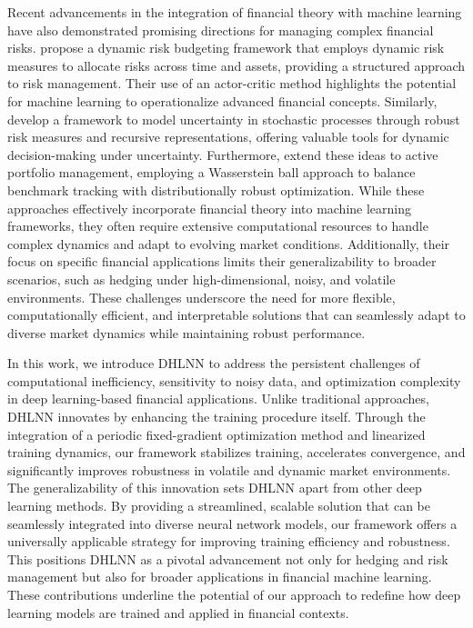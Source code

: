 Recent advancements in the integration of financial theory with machine learning have also demonstrated promising directions for managing complex financial risks.  \citet{pesenti2024risk} propose a dynamic risk budgeting framework that employs dynamic risk measures to allocate risks across time and assets, providing a structured approach to risk management. Their use of an actor-critic method highlights the potential for machine learning to operationalize advanced financial concepts. Similarly, \citet{moresco2024uncertainty} develop a framework to model uncertainty in stochastic processes through robust risk measures and recursive representations, offering valuable tools for dynamic decision-making under uncertainty. Furthermore, \citet{pesenti2023portfolio} extend these ideas to active portfolio management, employing a Wasserstein ball approach to balance benchmark tracking with distributionally robust optimization. While these approaches effectively incorporate financial theory into machine learning frameworks, they often  require extensive computational resources to handle complex dynamics and adapt to evolving market conditions. Additionally, their focus on specific financial applications limits their generalizability to broader scenarios, such as hedging under high-dimensional, noisy, and volatile environments. These challenges underscore the need for more flexible, computationally efficient, and interpretable solutions that can seamlessly adapt to diverse market dynamics while maintaining robust performance. 


In this work, we introduce DHLNN to address the persistent challenges of computational inefficiency, sensitivity to noisy data, and optimization complexity in deep learning-based financial applications. Unlike traditional approaches, DHLNN innovates by enhancing the training procedure itself. Through the integration of a periodic fixed-gradient optimization method and linearized training dynamics, our framework stabilizes training, accelerates convergence, and significantly improves robustness in volatile and dynamic market environments.
The generalizability of this innovation sets DHLNN apart from other deep learning methods. By providing a streamlined, scalable solution that can be seamlessly integrated into diverse neural network models, our framework offers a universally applicable strategy for improving training efficiency and robustness. This positions DHLNN as a pivotal advancement not only for hedging and risk management but also for broader applications in financial machine learning. These contributions underline the potential of our approach to redefine how deep learning models are trained and applied in financial contexts.